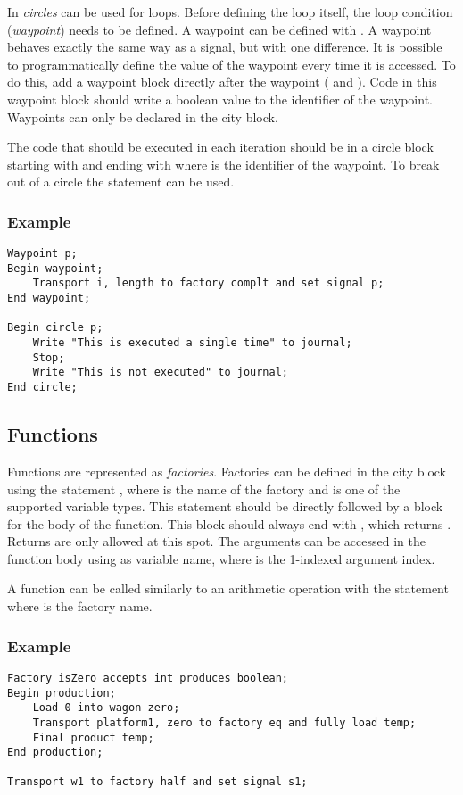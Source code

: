 In \shortname \emph{circles} can be used for loops. Before defining the loop itself, the loop condition (\emph{waypoint}) needs to be defined. A waypoint can be defined with . A waypoint behaves exactly the same way as a signal, but with one difference. It is possible to programmatically define the value of the waypoint every time it is accessed. To do this, add a waypoint block directly after the waypoint ( and ). Code in this waypoint block should write a boolean value to the identifier of the waypoint. Waypoints can only be declared in the  city block.

The code that should be executed in each iteration should be in a circle block starting with  and ending with  where  is the identifier of the waypoint. To break out of a circle the statement  can be used.

\subsubsection*{Example}

\begin{lstlisting}
Waypoint p;
Begin waypoint;
	Transport i, length to factory complt and set signal p;
End waypoint;

Begin circle p;
	Write "This is executed a single time" to journal;
	Stop;
	Write "This is not executed" to journal;
End circle;
\end{lstlisting}

\subsection{Functions}

Functions are represented as \emph{factories}. Factories can be defined in the  city block using the statement , where  is the name of the factory and  is one of the supported variable types. This statement should be directly followed by a  block for the body of the function. This block should always end with , which returns . Returns are only allowed at this spot. The arguments can be accessed in the function body using  as variable name, where  is the 1-indexed argument index.

A function can be called similarly to an arithmetic operation with the  statement where  is the factory name.

\subsubsection*{Example}

\begin{lstlisting}
Factory isZero accepts int produces boolean;
Begin production;
	Load 0 into wagon zero;
	Transport platform1, zero to factory eq and fully load temp;
	Final product temp;
End production;

Transport w1 to factory half and set signal s1;
\end{lstlisting}

